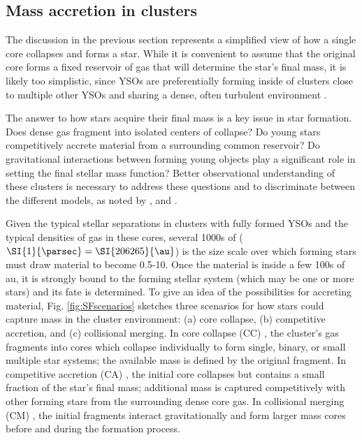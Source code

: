 \subsection{Mass accretion in clusters}


The discussion in the previous section represents a simplified view of how a single core collapses and forms a star. While it is convenient to assume that the original core forms a fixed reservoir of gas that will determine the star's final mass, it is likely too simplistic, since YSOs are preferentially forming inside of clusters close to multiple other YSOs and sharing a dense, often turbulent environment \citep{Porras:2003kxa,Allen:2007wqa,Gutermuth:2009gca}. 


The answer to how stars acquire their final mass is a key issue in star formation. Does dense gas fragment into isolated centers of collapse? Do young stars competitively accrete material from a surrounding common reservoir? Do gravitational interactions between forming young objects play a significant role in setting the final stellar mass function? Better observational understanding of these clusters is necessary to address these questions and to discriminate between the different models, as noted by \citet{Bonnell:2006ee}, \citet{Offner:2011ex} and \citet{Myers:2011fy}.

Given the typical stellar separations in clusters with fully formed YSOs and the typical densities of gas in these cores, several \num{1000}s of \si{\au} ($\SI{1}{\parsec} = \SI{206265}{\au} $) is the size scale over which forming stars must draw material to become 0.5-\SI{10}{\Msun}. Once the material is inside a few 100s of \si{au}, it is strongly bound to the forming stellar system (which may be one or more stars) and its fate is determined. To give an idea of the possibilities for accreting material, Fig. \ref{fig:SFscenarios} sketches three scenarios for how stars could capture mass in the cluster environment: (a) core collapse, (b) competitive accretion, and (c) collisional merging. In core collapse (CC) \citep[Fig.~\ref{subfig:scenarios:a},][]{McKee:2003gxa, Myers:2011fy}, the cluster's gas fragments into cores which collapse individually to form single, binary, or small multiple star systems; the available mass is defined by the original fragment. In competitive accretion (CA) \citep[Fig.~\ref{subfig:scenarios:b},][]{Bonnell:1997vta}, the initial core collapses but contains a small fraction of the star's final mass; additional mass is captured competitively with other forming stars from the surrounding dense core gas. In collisional merging (CM) \citep[Fig.~\ref{subfig:scenarios:c},][]{Bonnell:2002et}, the initial fragments interact gravitationally and form larger mass cores before and during the formation process. 

